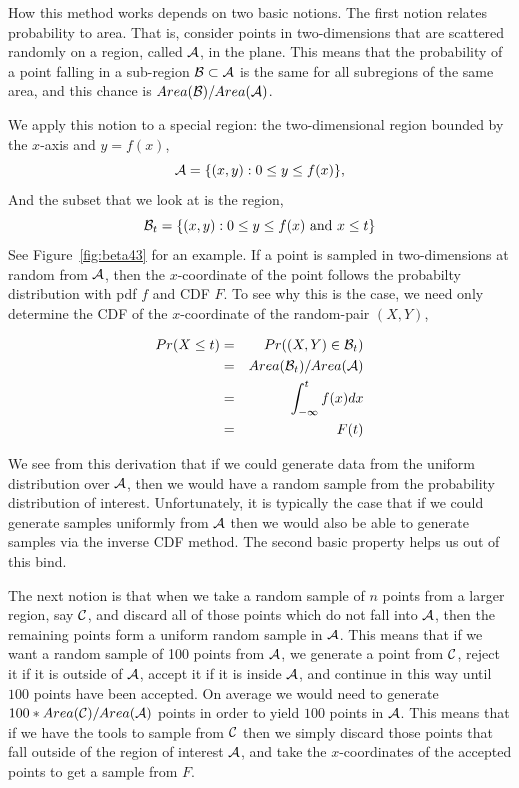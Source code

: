 How this method works depends on two basic notions.  The first notion
relates probability to area. That is, consider points in
two-dimensions that are scattered randomly on a region, called
$\cal{A}$, in the plane.  This means that the probability of a point
falling in a sub-region ${\cal{B}} \subset {\cal{A}}$ is the same for all
subregions of the same area, and this chance is $Area
({\cal{B}})/Area({\cal{A}})$.

We apply this notion to a special region: the two-dimensional region
bounded by the $x$-axis and $y = f(x)$,
$$
{\cal{A}} = \{ (x,y) : 0 \le y \le f(x) \},
$$
And the subset that we look at is the region,
$$
{\cal{B}}_t = \{ (x,y) : 0 \le y \le f(x) ~\textrm{and } x \le t \}
$$
See Figure~\ref{fig:beta43} for an example.
If a point is sampled in two-dimensions at random from $\cal{A}$, then
the $x$-coordinate of the point follows the probabilty distribution with 
pdf $f$ and CDF $F$.  
To see why this is the case, we need only determine the CDF 
of the $x$-coordinate of the random-pair $(X, Y)$, 

\begin{eqnarray*}
Pr(X \le t) & = & Pr( (X, Y) \in {\cal{B}}_t ) \\ 
                & = & Area({\cal{B}}_t) / Area({\cal{A}}) \\
                & = & \int_{-\infty}^t f(x) dx\\
                & = & F(t)
\end{eqnarray*}             

We see from this derivation that if we could generate data from the
uniform distribution over $\cal{A}$, then we would have a random
sample from the probability distribution of interest.  Unfortunately,
it is typically the case that if we could generate samples uniformly
from $\cal{A}$ then we would also be able to generate samples via the
inverse CDF method.  The second basic property helps us out of this
bind.

The next notion is that when we take a random sample of $n$ points
from a larger region, say $\cal{C}$, and discard all of those
points which do not fall into $\cal{A}$, then the remaining points
form a uniform random sample in $\cal{A}$.  This means that if we want
a random sample of 100 points from $\cal{A}$, we generate a point from
$\cal{C}$, reject it if it is outside of $\cal{A}$, accept it if it is
inside $\cal{A}$, and continue in this way until $100$ points have
been accepted.  On average we would need to generate $100*Area
({\cal{C}})/Area({\cal{A}})$ points in order to yield $100$ points in
$\cal{A}$.  This means that if we have the tools to sample from
$\cal{C}$ then we simply discard those points that fall outside of the
region of interest $\cal{A}$, and take the $x$-coordinates of the
accepted points to get a sample from $F$.

